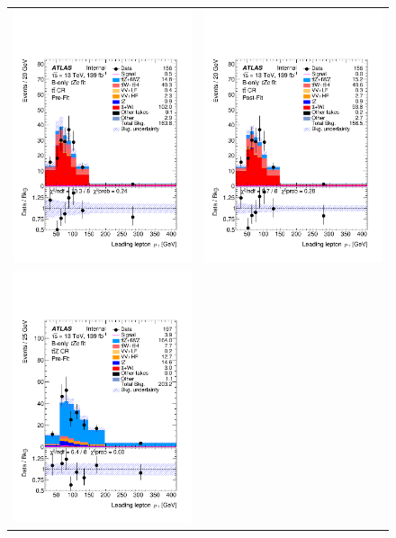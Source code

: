\begin{figure}[htbp]
	\centering
	\begin{tabular}{cc}
		\includegraphics[width=.45\textwidth]{Chapters/CH8/figures/BONLY_CRSR_DL1rc_unblind/Plots/TTCR} &
		\includegraphics[width=.45\textwidth]{Chapters/CH8/figures/BONLY_CRSR_DL1rc_unblind/Plots/TTCR_postFit} \\
		\includegraphics[width=.45\textwidth]{Chapters/CH8/figures/BONLY_CRSR_DL1rc_unblind/Plots/TTZCR} &

\end{tabular}
\end{figure}
